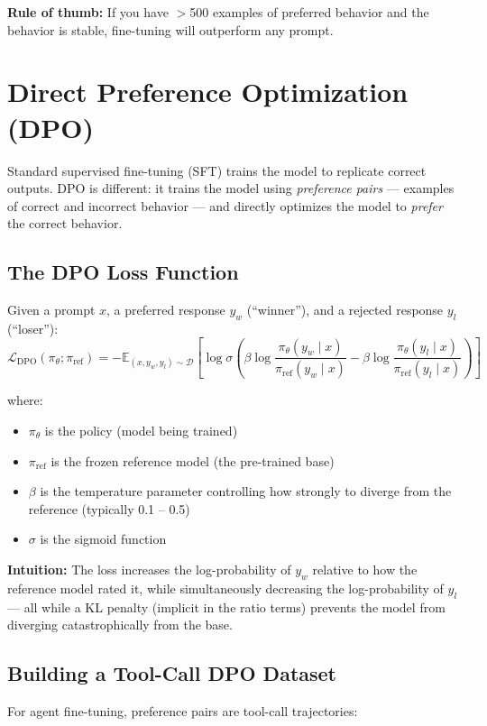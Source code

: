 \textbf{Rule of thumb:} If you have $>$500 examples of preferred behavior and the behavior is stable, fine-tuning will outperform any prompt.

\section{Direct Preference Optimization (DPO)}

Standard supervised fine-tuning (SFT) trains the model to replicate correct outputs. DPO is different: it trains the model using \textit{preference pairs} — examples of correct and incorrect behavior — and directly optimizes the model to \textit{prefer} the correct behavior.

\subsection{The DPO Loss Function}
Given a prompt $x$, a preferred response $y_w$ (``winner''), and a rejected response $y_l$ (``loser''):
\begin{equation}
\mathcal{L}_{\text{DPO}}(\pi_\theta; \pi_{\text{ref}}) = -\mathbb{E}_{(x, y_w, y_l) \sim \mathcal{D}} \left[ \log \sigma \!\left( \beta \log \frac{\pi_\theta(y_w \mid x)}{\pi_{\text{ref}}(y_w \mid x)} - \beta \log \frac{\pi_\theta(y_l \mid x)}{\pi_{\text{ref}}(y_l \mid x)} \right) \right]
\end{equation}

where:
\begin{itemize}
    \item $\pi_\theta$ is the policy (model being trained)
    \item $\pi_{\text{ref}}$ is the frozen reference model (the pre-trained base)
    \item $\beta$ is the temperature parameter controlling how strongly to diverge from the reference (typically 0.1 -- 0.5)
    \item $\sigma$ is the sigmoid function
\end{itemize}

\textbf{Intuition:} The loss increases the log-probability of $y_w$ relative to how the reference model rated it, while simultaneously decreasing the log-probability of $y_l$ — all while a KL penalty (implicit in the ratio terms) prevents the model from diverging catastrophically from the base.

\subsection{Building a Tool-Call DPO Dataset}
For agent fine-tuning, preference pairs are tool-call trajectories:


